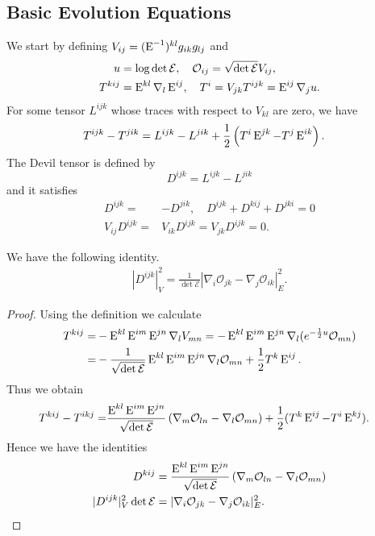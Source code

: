 \documentclass[a4paper, 12pt]{amsart}
\begin{document}
\subsection{Basic Evolution Equations}
\label{subsec:xcf_evolution}
We start by defining \(V_{ij}=(\operatorname{E}^{-1})^{kl}g_{ik}g_{lj}\)
and
\begin{align}
 u&=\log\det \mathcal{E},\quad
\mathcal{O}_{ij}=\sqrt{\det \mathcal{E}}V_{ij},\\
T^{kij}&=\operatorname{E}^{kl}\nabla_l \operatorname{E}^{ij},\quad T^i=V_{jk}T^{ijk}=\operatorname{E}^{ij}\nabla_ju.
\end{align}
For some tensor $L^{ijk}$ whose traces with respect to $V_{kl}$ are zero, we have
\begin{align}
    T^{ijk}-T^{jik}&=L^{ijk}-L^{jik}+\frac{1}{2}\left(T^i\operatorname{E}^{jk}-T^j\operatorname{E}^{ik}\right).
\end{align}
The Devil tensor is defined by
\[D^{ijk}=L^{ijk}-L^{jik}\]
and it satisfies
\begin{align}
D^{ijk}=&-D^{jik},\quad D^{ijk}+D^{kij}+D^{jki}=0\\
V_{ij}D^{ijk}=&V_{ik}D^{ijk}=V_{jk}D^{ijk}=0.
\end{align}
\begin{lemma}
\label{lem:cubicform_codazzi}
We have the following identity.
\begin{align}
|D^{ijk}|_V^2=\frac{1}{\det \mathcal{E}}|\nabla_i\mathcal{O}_{jk}-\nabla_j\mathcal{O}_{ik}|_E^2.
\end{align}
\end{lemma}
\begin{proof}
Using the definition we calculate
\begin{align}
T^{kij}=&-\operatorname{E}^{kl}\operatorname{E}^{im}\operatorname{E}^{jn}\nabla_l V_{mn}=-\operatorname{E}^{kl}\operatorname{E}^{im}\operatorname{E}^{jn}\nabla_l (e^{-\frac{1}{2}u}\mathcal{O}_{mn})\\
=&-\frac{1}{\sqrt{\det \mathcal{E}}}\operatorname{E}^{kl}\operatorname{E}^{im}\operatorname{E}^{jn}\nabla_l \mathcal{O}_{mn}+\frac{1}{2}T^k\operatorname{E}^{ij}.
\end{align}
Thus we obtain
\begin{align*}
T^{kij}-T^{ikj}=&\frac{\operatorname{E}^{kl}\operatorname{E}^{im}\operatorname{E}^{jn}}{\sqrt{\det \mathcal{E}}}\left(\nabla_m \mathcal{O}_{ln}-\nabla_l \mathcal{O}_{mn}\right)+\frac{1}{2}(T^k\operatorname{E}^{ij}-T^i\operatorname{E}^{kj}).
\end{align*}
Hence we have the identities
\begin{align}
D^{kij}&=\frac{\operatorname{E}^{kl}\operatorname{E}^{im}\operatorname{E}^{jn}}{\sqrt{\det \mathcal{E}}}\left(\nabla_m \mathcal{O}_{ln}-\nabla_l \mathcal{O}_{mn}\right)\\
|D^{ijk}|_V^2\det \mathcal{E}&=|\nabla_i\mathcal{O}_{jk}-\nabla_j\mathcal{O}_{ik}|_E^2.
\end{align}
\end{proof}
\end{document}
